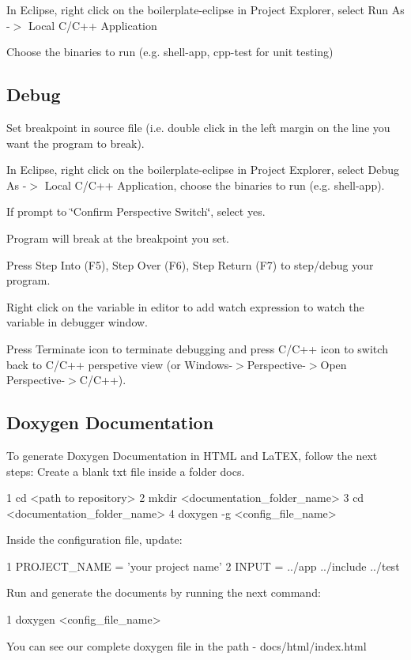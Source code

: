 \begin{DoxyEnumerate}
\item In Eclipse, right click on the boilerplate-\/eclipse in Project Explorer, select Run As -\/$>$ Local C/\+C++ Application
\item Choose the binaries to run (e.\+g. shell-\/app, cpp-\/test for unit testing)
\end{DoxyEnumerate}

\subsection*{Debug}


\begin{DoxyEnumerate}
\item Set breakpoint in source file (i.\+e. double click in the left margin on the line you want the program to break).
\item In Eclipse, right click on the boilerplate-\/eclipse in Project Explorer, select Debug As -\/$>$ Local C/\+C++ Application, choose the binaries to run (e.\+g. shell-\/app).
\item If prompt to \char`\"{}\+Confirm Perspective Switch\char`\"{}, select yes.
\item Program will break at the breakpoint you set.
\item Press Step Into (F5), Step Over (F6), Step Return (F7) to step/debug your program.
\item Right click on the variable in editor to add watch expression to watch the variable in debugger window.
\item Press Terminate icon to terminate debugging and press C/\+C++ icon to switch back to C/\+C++ perspetive view (or Windows-\/$>$Perspective-\/$>$Open Perspective-\/$>$C/\+C++).
\end{DoxyEnumerate}

\subsection*{Doxygen Documentation}

To generate Doxygen Documentation in H\+T\+ML and La\+T\+EX, follow the next steps\+: Create a blank txt file inside a folder docs. 
\begin{DoxyCode}
1 cd <path to repository>
2 mkdir <documentation\_folder\_name>
3 cd <documentation\_folder\_name>
4 doxygen -g <config\_file\_name>
\end{DoxyCode}
 Inside the configuration file, update\+: 
\begin{DoxyCode}
1 PROJECT\_NAME = 'your project name'
2 INPUT = ../app ../include ../test
\end{DoxyCode}
 Run and generate the documents by running the next command\+: 
\begin{DoxyCode}
1 doxygen <config\_file\_name>
\end{DoxyCode}
 You can see our complete doxygen file in the path -\/ docs/html/index.\+html

